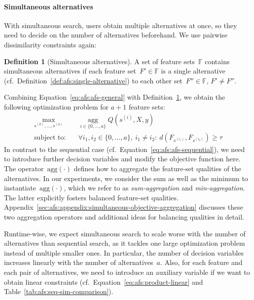 \documentclass{article}
\theoremstyle{definition}
\newtheorem{definition}{Definition}
\begin{document}
\paragraph{Simultaneous alternatives}

With simultaneous search, users obtain multiple alternatives at once, so they need to decide on the number of alternatives beforehand.
We use pairwise dissimilarity constraints again:
%
\begin{definition}[Simultaneous alternatives]
	A set of feature sets~$\mathbb{F}$ contains simultaneous alternatives if each feature set~$F' \in \mathbb{F}$ is a single alternative (cf.~Definition~\ref{def:afs:single-alternative}) to each other set~$F'' \in \mathbb{F}$, $F' \neq F''$.
	\label{def:afs:simultaneous-alternative}
\end{definition}
%
Combining Equation~\ref{eq:afs:afs-general} with Definition~\ref{def:afs:simultaneous-alternative}, we obtain the following optimization problem for $a+1$ feature sets:
%
\begin{equation}
	\begin{aligned}
		\max_{s^{(0)}, \dots, s^{(a)}} &\quad \operatorname*{agg}_{i \in \{0, \dots, a\}} Q(s^{(i)},X,y) \\
		\text{subject to:} &\quad \forall i_1, i_2 \in \{0, \dots, a\},~i_1 \neq i_2:~d(F_{s^{(i_1)}},F_{s^{(i_2)}}) \geq \tau
	\end{aligned}
	\label{eq:afs:afs-simultaneous}
\end{equation}
%
In contrast to the sequential case (cf.~Equation~\ref{eq:afs:afs-sequential}), we need to introduce further decision variables and modify the objective function here.
The operator~$\text{agg}(\cdot)$ defines how to aggregate the feature-set qualities of the alternatives.
In our experiments, we consider the sum as well as the minimum to instantiate~$\text{agg}(\cdot)$, which we refer to as \emph{sum-aggregation} and \emph{min-aggregation}.
The latter explicitly fosters balanced feature-set qualities.
Appendix~\ref{sec:afs:appendix:simultaneous-objective-aggregation} discusses these two aggregation operators and additional ideas for balancing qualities in detail.

Runtime-wise, we expect simultaneous search to scale worse with the number of alternatives than sequential search, as it tackles one large optimization problem instead of multiple smaller ones.
In particular, the number of decision variables increases linearly with the number of alternatives~$a$.
Also, for each feature and each pair of alternatives, we need to introduce an auxiliary variable if we want to obtain linear constraints (cf.~Equation~\ref{eq:afs:product-linear} and Table~\ref{tab:afs:seq-sim-comparison}).
\end{document}
